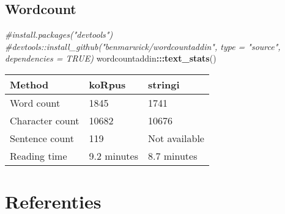 \documentclass[
]{article}
\newenvironment{Shaded}{\begin{snugshade}}{\end{snugshade}}
\newcommand{\CommentTok}[1]{\textcolor[rgb]{0.56,0.35,0.01}{\textit{#1}}}
\newcommand{\FunctionTok}[1]{\textcolor[rgb]{0.13,0.29,0.53}{\textbf{#1}}}
\newcommand{\NormalTok}[1]{#1}
\newcommand{\SpecialCharTok}[1]{\textcolor[rgb]{0.81,0.36,0.00}{\textbf{#1}}}
\begin{document}
\subsection{Wordcount}\label{wordcount}

\begin{Shaded}
\begin{Highlighting}[]
\CommentTok{\#install.packages("devtools")}
\CommentTok{\#devtools::install\_github("benmarwick/wordcountaddin", type = "source", dependencies = TRUE)}
\NormalTok{wordcountaddin}\SpecialCharTok{:::}\FunctionTok{text\_stats}\NormalTok{()}
\end{Highlighting}
\end{Shaded}

\begin{tabular}{l|l|l}
\hline
Method & koRpus & stringi\\
\hline
Word count & 1845 & 1741\\
\hline
Character count & 10682 & 10676\\
\hline
Sentence count & 119 & Not available\\
\hline
Reading time & 9.2 minutes & 8.7 minutes\\
\hline
\end{tabular}

\section{Referenties}\label{referenties}
\end{document}
